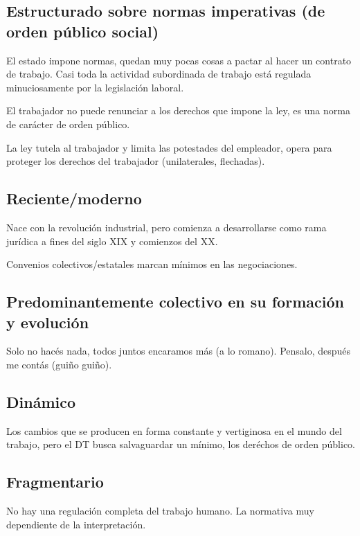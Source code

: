 \documentclass[spanish,12pt,a4paper,titlepage]{report}
\begin{document}
\subsection{Estructurado sobre normas imperativas (de orden público social)}
\label{sec:estructurado-por-normas-imperativas}

El estado impone normas, quedan muy pocas cosas a pactar al hacer un contrato de trabajo. Casi toda la actividad subordinada de trabajo está regulada minuciosamente por la legislación laboral. 

El trabajador no puede renunciar a los derechos que impone la ley, es una norma de carácter de orden público.

La ley tutela al trabajador y limita las potestades del empleador, opera para proteger los derechos del trabajador (unilaterales, flechadas).

\subsection{Reciente/moderno}
\label{sec:reciente-moderno}

Nace con la revolución industrial, pero comienza a desarrollarse como rama jurídica a fines del siglo XIX y comienzos del XX.

Convenios colectivos/estatales marcan mínimos en las negociaciones.

\subsection{Predominantemente colectivo en su formación y evolución}

Solo no hacés nada, todos juntos encaramos más (a lo romano). Pensalo, después me contás (guiño guiño).

\subsection{Dinámico}
\label{sec:dinamico}

Los cambios que se producen en forma constante y vertiginosa en el mundo del trabajo, pero el DT busca salvaguardar un mínimo, los deréchos de orden público.

\subsection{Fragmentario}
\label{sec:fragmentario}

No hay una regulación completa del trabajo humano. La normativa muy dependiente de la interpretación.
\end{document}
